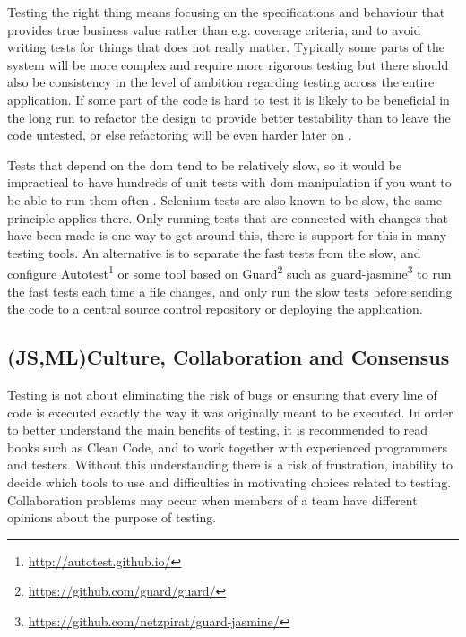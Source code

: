 \documentclass[11pt]{article}
\begin{document}
Testing the right thing means focusing on the specifications and behaviour that provides true business value rather than e.g. coverage criteria, and to avoid writing tests for things that does not really matter. Typically some parts of the system will be more complex and require more rigorous testing but there should also be consistency in the level of ambition regarding testing across the entire application. If some part of the code is hard to test it is likely to be beneficial in the long run to refactor the design to provide better testability than to leave the code untested, or else refactoring will be even harder later on \cite{Refactoring}. %

Tests that depend on the \gls{dom} tend to be relatively slow, so it would be impractical to have hundreds of unit tests with \gls{dom} manipulation if you want to be able to run them often \cite[questions~21-22]{Stenmark}. Selenium tests are also known to be slow, the same principle applies there. Only running tests that are connected with changes that have been made is one way to get around this, there is support for this in many testing tools. An alternative is to separate the fast tests from the slow, and configure Autotest\footnote{\url{http://autotest.github.io/}} or some tool based on Guard\footnote{\url{https://github.com/guard/guard/}} such as guard-jasmine\footnote{\url{https://github.com/netzpirat/guard-jasmine/}} to run the fast tests each time a file changes, and only run the slow tests before sending the code to a central source control repository or deploying the application.

\subsection{(JS,ML)Culture, Collaboration and Consensus}
\label{subsec:ccc}

Testing is not about eliminating the risk of bugs or ensuring that every line of code is executed exactly the way it was originally meant to be executed. In order to better understand the main benefits of testing, it is recommended to read books such as Clean Code\cite{Clean}, and to work together with experienced programmers and testers. Without this understanding there is a risk of frustration, inability to decide which tools to use and difficulties in motivating choices related to testing. Collaboration problems may occur when members of a team have different opinions about the purpose of testing. \cite[question~38]{Edelstam}
\end{document}
